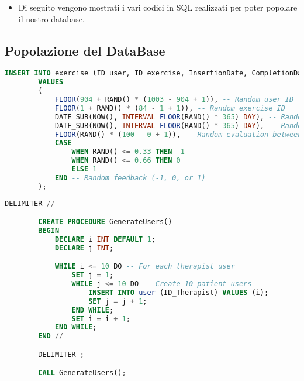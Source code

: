 \documentclass{article}
\begin{document}
    \begin{itemize}
        \item Di seguito vengono mostrati i vari codici in SQL realizzati per poter popolare il nostro database.
    \end{itemize}


    \pagebreak

    \subsection{Popolazione del DataBase}

    \begin{lstlisting}[language=SQL, breaklines, caption=Generazione Casuale esecuzione esercizio]
        INSERT INTO exercise (ID_user, ID_exercise, InsertionDate, CompletionDate, Evaluation, Feedback)
        VALUES
        (
            FLOOR(904 + RAND() * (1003 - 904 + 1)), -- Random user ID
            FLOOR(1 + RAND() * (84 - 1 + 1)), -- Random exercise ID
            DATE_SUB(NOW(), INTERVAL FLOOR(RAND() * 365) DAY), -- Random date within the past year
            DATE_SUB(NOW(), INTERVAL FLOOR(RAND() * 365) DAY), -- Random completion date within the past year
            FLOOR(RAND() * (100 - 0 + 1)), -- Random evaluation between 0 and 100
            CASE
                WHEN RAND() <= 0.33 THEN -1
                WHEN RAND() <= 0.66 THEN 0
                ELSE 1
            END -- Random feedback (-1, 0, or 1)
        );
    \end{lstlisting}

    \begin{lstlisting}[language=SQL, breaklines, caption=Generazione degli utenti]
        DELIMITER //

        CREATE PROCEDURE GenerateUsers()
        BEGIN
            DECLARE i INT DEFAULT 1;
            DECLARE j INT;

            WHILE i <= 10 DO -- For each therapist user
                SET j = 1;
                WHILE j <= 10 DO -- Create 10 patient users
                    INSERT INTO user (ID_Therapist) VALUES (i);
                    SET j = j + 1;
                END WHILE;
                SET i = i + 1;
            END WHILE;
        END //

        DELIMITER ;

        CALL GenerateUsers();
    \end{lstlisting}
\end{document}

